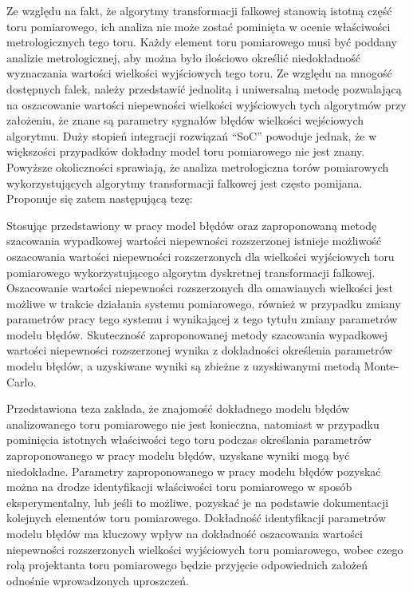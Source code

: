Ze względu na fakt, że algorytmy transformacji falkowej stanowią istotną część toru pomiarowego, ich analiza nie może zostać pominięta w ocenie właściwości metrologicznych tego toru. Każdy element toru pomiarowego musi być poddany analizie metrologicznej, aby można było ilościowo określić niedokładność wyznaczania wartości wielkości wyjściowych tego toru. Ze względu na mnogość dostępnych falek, należy przedstawić jednolitą i uniwersalną metodę pozwalającą na oszacowanie wartości niepewności wielkości wyjściowych tych algorytmów przy założeniu, że znane są parametry sygnałów błędów wielkości wejściowych algorytmu. Duży stopień integracji rozwiązań \enquote{SoC} powoduje jednak, że w większości przypadków dokładny model toru pomiarowego nie jest znany. Powyższe okoliczności sprawiają, że analiza metrologiczna torów pomiarowych wykorzystujących algorytmy transformacji falkowej jest często pomijana. Proponuje się zatem następującą tezę:

\begin{quoting}[font = bfseries]
Stosując przedstawiony w pracy model błędów oraz zaproponowaną metodę szacowania wypadkowej wartości niepewności rozszerzonej istnieje możliwość oszacowania wartości niepewności rozszerzonych dla wielkości wyjściowych toru pomiarowego wykorzystującego algorytm dyskretnej transformacji falkowej. Oszacowanie wartości niepewności rozszerzonych dla omawianych wielkości jest możliwe w trakcie działania systemu pomiarowego, również w przypadku zmiany parametrów pracy tego systemu i wynikającej z tego tytułu zmiany parametrów modelu błędów. Skuteczność zaproponowanej metody szacowania wypadkowej wartości niepewności rozszerzonej wynika z dokładności określenia parametrów modelu błędów, a uzyskiwane wyniki są zbieżne z uzyskiwanymi metodą Monte-Carlo.
\end{quoting}

Przedstawiona teza zakłada, że znajomość dokładnego modelu błędów analizowanego toru pomiarowego nie jest konieczna, natomiast w przypadku pominięcia istotnych właściwości tego toru podczas określania parametrów zaproponowanego w pracy modelu błędów, uzyskane wyniki mogą być niedokładne. Parametry zaproponowanego w pracy modelu błędów pozyskać można na drodze identyfikacji właściwości toru pomiarowego w sposób eksperymentalny, lub jeśli to możliwe, pozyskać je na podstawie dokumentacji kolejnych elementów toru pomiarowego. Dokładność identyfikacji parametrów modelu błędów ma kluczowy wpływ na dokładność oszacowania wartości niepewności rozszerzonych wielkości wyjściowych toru pomiarowego, wobec czego rolą projektanta toru pomiarowego będzie przyjęcie odpowiednich założeń odnośnie wprowadzonych uproszczeń.

